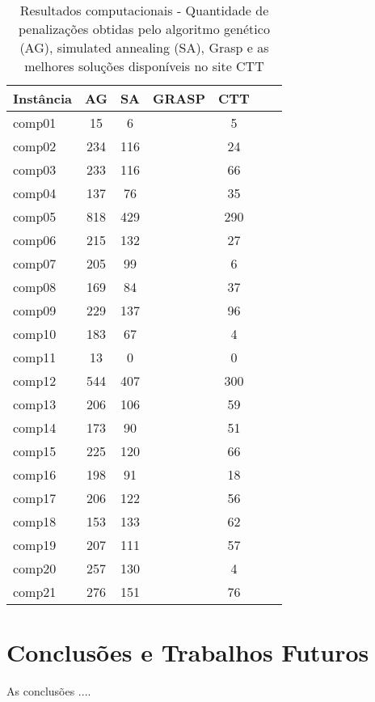 \documentclass[11pt]{article}
\begin{document}
\begin{table}

\centering
\begin{tabular}{|l|c|c|c|c|c|c|} 
\hline

Instância & AG & SA & GRASP & CTT &  \\ \hline

comp01 & 15 & 6 & & 5 & \\
comp02 & 234 & 116 & & 24 & \\
comp03 & 233 & 116 &  & 66 & \\
comp04 & 137 & 76 & & 35 & \\
comp05 & 818 & 429 & & 290 & \\
comp06 & 215 & 132 & & 27 & \\
comp07 & 205 & 99 & & 6 & \\
comp08 & 169 & 84 & & 37 & \\
comp09 & 229 & 137 & & 96 & \\
comp10 & 183 & 67 & & 4 & \\
comp11 & 13 & 0 & & 0 & \\
comp12 & 544 & 407 & & 300 & \\
comp13 & 206 & 106 & & 59 & \\
comp14 & 173 & 90 & & 51 & \\
comp15 & 225 & 120 & & 66 & \\
comp16 & 198 & 91 & & 18 & \\
comp17 & 206 & 122 & & 56 & \\
comp18 & 153 & 133 & & 62 & \\
comp19 & 207 & 111 & & 57 & \\
comp20 & 257 & 130 & & 4 & \\
comp21 & 276 & 151 & & 76 & \\

\hline
\end{tabular}
\caption{Resultados computacionais - Quantidade de penalizações obtidas pelo algoritmo genético (AG), simulated annealing (SA), Grasp e as melhores soluções disponíveis no site CTT}
\label{tabResultados}
\end{table} 


\section{Conclusões e Trabalhos Futuros}
\label{sec:conclusao}

As conclusões ....
\end{document}
